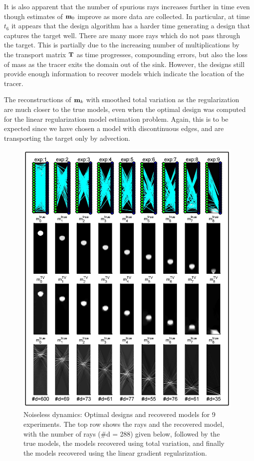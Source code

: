 \documentclass[11pt]{article}
\begin{document}
It is also apparent that the number of spurious rays increases further in time even though estimates of ${\bf{m}}_0$ improve as more data are collected. In particular, at time $t_6$ it appears that the design algorithm has a harder time generating a design that captures the target well. There are many more rays which do not pass through the target. This is partially due to the increasing number of multiplications by the transport matrix ${\bf{T}}$ as time progresses, compounding errors, but also the loss of mass as the tracer exits the domain out of the sink. However, the designs still provide enough information to recover models which indicate the location of the tracer.  

The reconstructions of ${\bf{m}}_k$ with smoothed total variation as the regularization are much closer to the true models, even when the optimal design was computed for the linear regularization model estimation problem. Again, this is to be expected since we have chosen a model with discontinuous edges, and are transporting the target only by advection. 
\begin{figure}
	\begin{center}
	\iwidth=160mm
	\includegraphics[width = 1\iwidth]{figures/noiselessFigs/noiselessResults}
	\end{center}
	\caption{Noiseless dynamics: Optimal designs and recovered models for 9 	experiments. The top row shows the rays and the recovered model, with 		the number of rays (\#d = 288) given below, followed by the true 			models, the models recovered using total variation, and finally the 		models recovered using the linear gradient regularization.}
	\label{fig:results1}
\end{figure}
\end{document}
